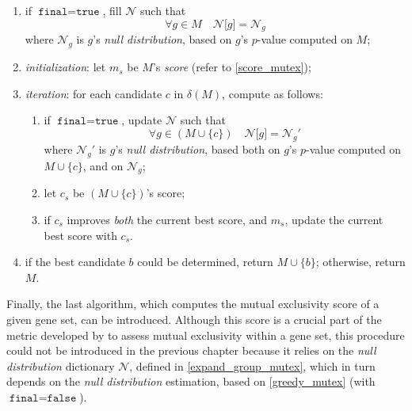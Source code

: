 \begin{enumerate}
    \item if $\texttt{final} = \texttt{true}$, fill $\mathcal N$ such that $$\forall g \in M \quad \mathcal N \texttt{[}g\texttt{]} = \mathcal N_g$$ where $\mathcal N_g$ is $g$'s \textit{null distribution}, based on $g$'s $p$-value computed on $M$;
    \item \textit{initialization}: let $m_s$ be $M$'s \textit{score} (refer to \cref{score_mutex});
    \item \textit{iteration}: for each candidate $c$ in $\delta(M)$, compute as follows:
        \begin{enumerate}
            \item if $\texttt{final} = \texttt{true}$, update $\mathcal N$ such that $$\forall g \in (M \cup \{c\}) \quad \mathcal N \texttt{[}g\texttt{]} = \mathcal N_g'$$ where $\mathcal N_g'$ is $g$'s \textit{null distribution}, based both on $g$'s $p$-value computed on $M \cup \{c\}$, and on $\mathcal N_g$;
            \item let $c_s$ be $(M \cup \{c\})$'s score;
            \item if $c_s$ improves \textit{both} the current best score, and $m_s$, update the current best score with $c_s$.
        \end{enumerate}
    \item if the best candidate $b$ could be determined, return $M \cup \{b\}$; otherwise, return $M$.
\end{enumerate}


Finally, the last algorithm, which computes the mutual exclusivity score of a given gene set, can be introduced. Although this score is a crucial part of the metric developed by \textcite{mutex} to assess mutual exclusivity within a gene set, this procedure could not be introduced in the previous chapter because it relies on the \textit{null distribution} dictionary $\mathcal{N}$, defined in \cref{expand_group_mutex}, which in turn depends on the \textit{null distribution} estimation, based on \cref{greedy_mutex} (with $\texttt{final} = \texttt{false}$).

